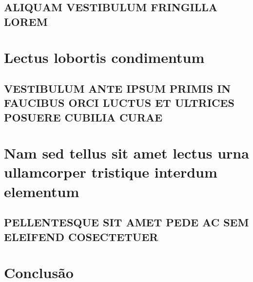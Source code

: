 \documentclass[
	12pt,				%
	openright,			%
	oneside,			%
	a4paper,			%
	chapter=TITLE,		%
	english,			%
	french,				%
	spanish,			%
	brazil				%
	]{ppgtecs-ifes-abntex2}
\begin{document}
\section{ALIQUAM VESTIBULUM FRINGILLA LOREM}

\lipsum[1]

\lipsum[2-3]


\chapter{Lectus lobortis condimentum}
\setlength\afterchapskip{\lineskip}

\section{VESTIBULUM ANTE IPSUM PRIMIS IN FAUCIBUS ORCI LUCTUS ET ULTRICES POSUERE CUBILIA CURAE}

\lipsum[21-22]

\chapter{Nam sed tellus sit amet lectus urna ullamcorper tristique interdum
elementum}
\setlength\afterchapskip{\lineskip}

\section{PELLENTESQUE SIT AMET PEDE AC SEM ELEIFEND COSECTETUER}

\lipsum[24]


\chapter{Conclusão}
\setlength\afterchapskip{\lineskip}

\lipsum[31-33]

\postextual
\end{document}
